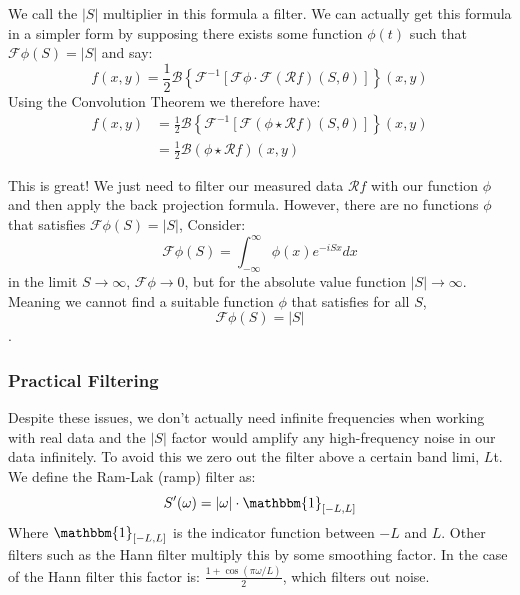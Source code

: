 \documentclass{article}
\theoremstyle{definition}
\begin{document}
We call the $|S|$ multiplier in this formula a filter. We can actually get this formula in a simpler form by supposing there exists some function $\phi(t)$ such that $\mathcal{F}\phi (S) = |S|$ and say:
$$
f(x,y) = \frac{1}{2} \mathcal{B} \left\lbrace \mathcal{F}^{-1} \left[ \mathcal{F}\phi \cdot \mathcal{F} \left( \mathcal{R}f \right) \left( S, \theta \right) \right] \right\rbrace (x,y)
$$
Using the Convolution Theorem \cite{wolfram_convolution} we therefore have:
\begin{align*}
f(x,y) &= \frac{1}{2} \mathcal{B} \left\lbrace \mathcal{F}^{-1} \left[ \mathcal{F} \left(\phi \star \mathcal{R}f \right) \left( S, \theta \right) \right] \right\rbrace (x,y) \\
&= \frac{1}{2} \mathcal{B} \left(\phi \star \mathcal{R}f \right) (x,y)
\end{align*}

This is great! We just need to filter our measured data $\mathcal{R}f$ with our function $\phi$ and then apply the back projection formula. However, there are no functions $\phi$ that satisfies $\mathcal{F} \phi(S) = |S|$, Consider:
$$
\mathcal{F}\phi(S) = \int_{-\infty}^{\infty} \phi(x)e^{-iSx} dx
$$
in the limit $S \to \infty$, $\mathcal{F}\phi \to 0$, but for the absolute value function $|S| \to \infty$. Meaning we cannot find a suitable function $\phi$ that satisfies for all $S$, 
$$\mathcal{F}\phi(S) = |S|$$.

\subsubsection{Practical Filtering}
Despite these issues, we don't actually need infinite frequencies when working with real data and the $|S|$ factor would amplify any high-frequency noise in our data infinitely. To avoid this we zero out the filter above a certain band limi, $L$t.
We define the Ram-Lak (ramp) filter as:
$$S'(\omega) = |\omega| \cdot \mathbbm{1}_{[-L,L]}$$
Where $\mathbbm{1}_{[-L,L]}$ is the indicator function between $-L$ and $L$. Other filters such as the Hann filter multiply this by some smoothing factor. In the case of the Hann filter this factor is:
$\frac{1 + \cos \left( \pi \omega / L \right)}{2}$, which filters out noise.
\end{document}
